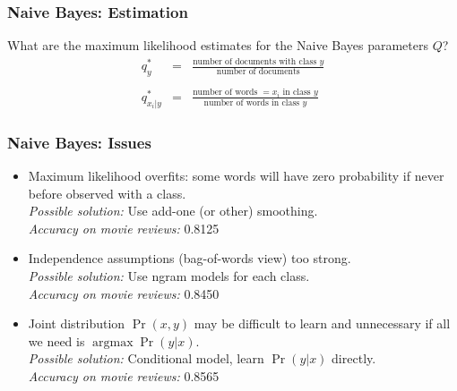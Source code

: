 \documentclass[ignorenonframetext,plain]{beamer}
\DeclareMathOperator*{\argmax}{argmax}
\begin{document}
\begin{frame}\frametitle{Naive Bayes: Estimation}
What are the maximum likelihood estimates for the Naive Bayes
parameters $Q$?\begin{eqnarray*}
q_y^* &=& \frac{\mbox{number of documents with class
    $y$}}{\mbox{number of documents}}\\
\\
q_{x_i|y}^* &=& \frac{\mbox{number of words $=x_i$ in class
    $y$}}{\mbox{number of words in class $y$}}
\end{eqnarray*}  
\end{frame}

\begin{frame}\frametitle{Naive Bayes: Issues}
\begin{itemize}
\item Maximum likelihood overfits: some words will have zero
  probability if never before observed with a class.
  \\ \textsl{Possible solution:} Use add-one (or other) smoothing.
  \\ \textsl{Accuracy on movie reviews:} 0.8125
\item Independence assumptions (bag-of-words view) too strong.
  \\ \textsl{Possible solution:} Use ngram models for each class.
  \\ \textsl{Accuracy on movie reviews:} 0.8450
\item Joint distribution $\Pr(x,y)$ may be difficult to learn and
  unnecessary if all we need is $\argmax\Pr(y|x)$.
  \\ \textsl{Possible solution:} Conditional model, learn
  $\Pr(y|x)$ directly.
  \\ \textsl{Accuracy on movie reviews:} 0.8565
\end{itemize}
\end{frame}
\end{document}
